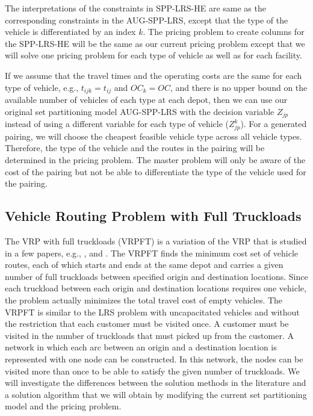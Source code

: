 The interpretations of the constraints in SPP-LRS-HE are same as the 
corresponding constraints in the AUG-SPP-LRS, except that the type of the vehicle
is differentiated by an index $k$. The pricing problem to create columns for the 
SPP-LRS-HE will be the same as our current pricing problem except that we will solve 
one pricing problem for each type of vehicle as well as for each facility. 

If we assume that the travel times and the operating costs are the same for each 
type of vehicle, e.g., $t_{ijk}=t_{ij}$ and $OC_k=OC$, and there is no upper 
bound on the available number of vehicles of each type at each depot, then 
we can use our original set partitioning model AUG-SPP-LRS with the decision 
variable $Z_{jp}$ instead of using a different variable for each type of vehicle 
($Z^k_{jp}$). For a generated pairing, we will choose the cheapest feasible vehicle 
type across all vehicle types. Therefore, the type of the vehicle and the routes 
in the pairing will be determined in the pricing problem. The master problem will 
only be aware of the cost of the pairing but not be able to differentiate the 
type of the vehicle used for the pairing.  



\subsection{Vehicle Routing Problem with Full Truckloads}

The VRP with full truckloads (VRPFT) is a variation of the VRP that is studied 
in a few papers, e.g., \citet{Desrosiers2}, \citet{Arunapuram} and \citet{Gronalt}. 
The VRPFT finds the minimum cost set of vehicle routes, each of which starts and ends at 
the same depot and carries a given number of full truckloads between specified origin 
and destination locations. Since each truckload between each origin and destination 
locations requires one vehicle, the problem actually minimizes the 
total travel cost of empty vehicles. The VRPFT is similar to the LRS problem with
uncapacitated vehicles and without the restriction that each customer must be 
visited once. A customer must be visited in the number of truckloads that must picked up
from the customer. A network in which each arc between an origin and a destination   
location is represented with one node can be constructed. In this network, the nodes 
can be visited more than once to be able to satisfy the given number of truckloads. 
We will investigate the differences between the solution methods in the literature 
and a solution algorithm that we will obtain by modifying the current set 
partitioning model and the pricing problem.       




